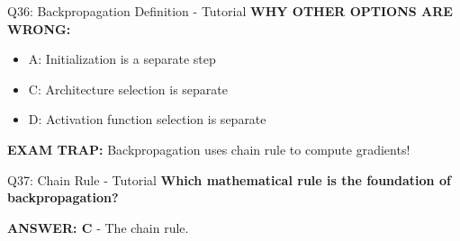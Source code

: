 \documentclass[8pt]{beamer}
\begin{document}
\begin{frame}{Q36: Backpropagation Definition - Tutorial}
		\vspace{0.05cm}
		\textcolor{myred}{\textbf{WHY OTHER OPTIONS ARE WRONG:}}
		\begin{itemize}
			\item \textcolor{myred}{A:} Initialization is a separate step
			\item \textcolor{myred}{C:} Architecture selection is separate
			\item \textcolor{myred}{D:} Activation function selection is separate
		\end{itemize}
		
		\textcolor{myred}{\textbf{EXAM TRAP:}} Backpropagation uses \textcolor{myblue}{chain rule} to compute gradients!
	\end{frame}
	
	\begin{frame}{Q37: Chain Rule - Tutorial}
		\fontsize{6.5}{7.5}\selectfont
		\textbf{Which mathematical rule is the foundation of backpropagation?}
		
		\vspace{0.05cm}
		\textcolor{myblue}{\textbf{ANSWER: C}} - The chain rule.
		

\end{frame}
\end{document}
